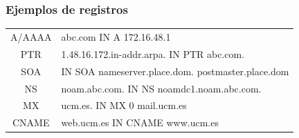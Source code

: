 \subsubsection{Ejemplos de registros}
\begin{table}[H]\centering
\begin{tabular}{cl}
A/AAAA & abc.com IN A 172.16.48.1                             \\
PTR    & 1.48.16.172.in-addr.arpa. IN PTR abc.com.            \\
SOA    & IN  SOA  nameserver.place.dom.  postmaster.place.dom \\
NS     & noam.abc.com. IN NS noamdc1.noam.abc.com.            \\
MX     & ucm.es. IN MX 0 mail.ucm.es                          \\
CNAME  & web.ucm.es IN CNAME www.ucm.es                      
\end{tabular}
\end{table}
